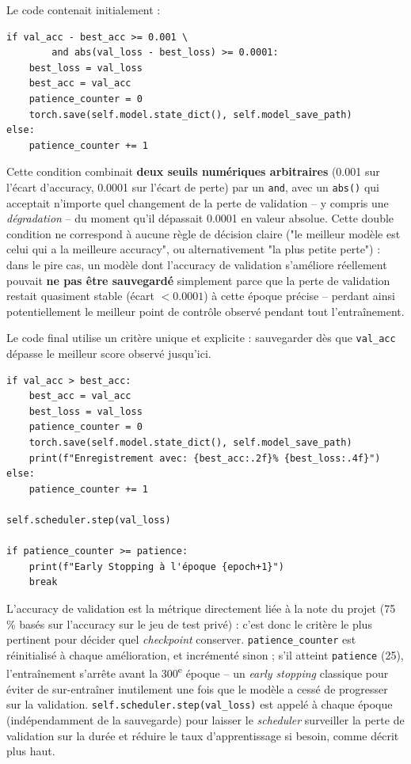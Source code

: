 \documentclass[a4paper,12pt]{article}
\begin{document}
Le code contenait initialement :
\begin{lstlisting}
if val_acc - best_acc >= 0.001 \
        and abs(val_loss - best_loss) >= 0.0001:
    best_loss = val_loss
    best_acc = val_acc
    patience_counter = 0
    torch.save(self.model.state_dict(), self.model_save_path)
else:
    patience_counter += 1
\end{lstlisting}

Cette condition combinait \textbf{deux seuils numériques arbitraires}
(0.001 sur l'écart d'accuracy, 0.0001 sur l'écart de perte) par un
\texttt{and}, avec un \texttt{abs()} qui acceptait n'importe quel
changement de la perte de validation -- y compris une
\emph{dégradation} -- du moment qu'il dépassait 0.0001 en valeur
absolue. Cette double condition ne correspond à aucune règle de décision
claire ("le meilleur modèle est celui qui a la meilleure accuracy", ou
alternativement "la plus petite perte") : dans le pire cas, un modèle
dont l'accuracy de validation s'améliore réellement pouvait \textbf{ne
pas être sauvegardé} simplement parce que la perte de validation restait
quasiment stable (écart $< 0.0001$) à cette époque précise -- perdant
ainsi potentiellement le meilleur point de contrôle observé pendant tout
l'entraînement.

Le code final utilise un critère unique et explicite : sauvegarder dès
que \texttt{val\_acc} dépasse le meilleur score observé jusqu'ici.

\begin{lstlisting}
if val_acc > best_acc:
    best_acc = val_acc
    best_loss = val_loss
    patience_counter = 0
    torch.save(self.model.state_dict(), self.model_save_path)
    print(f"Enregistrement avec: {best_acc:.2f}% {best_loss:.4f}")
else:
    patience_counter += 1

self.scheduler.step(val_loss)

if patience_counter >= patience:
    print(f"Early Stopping à l'époque {epoch+1}")
    break
\end{lstlisting}

L'accuracy de validation est la métrique directement liée à la note du
projet (75\,\% basés sur l'accuracy sur le jeu de test privé) : c'est
donc le critère le plus pertinent pour décider quel \emph{checkpoint}
conserver. \texttt{patience\_counter} est réinitialisé à chaque
amélioration, et incrémenté sinon ; s'il atteint \texttt{patience} (25),
l'entraînement s'arrête avant la 300\textsuperscript{e} époque -- un \emph{early
stopping} classique pour éviter de sur-entraîner inutilement une fois que
le modèle a cessé de progresser sur la validation.
\texttt{self.scheduler.step(val\_loss)} est appelé à chaque époque
(indépendamment de la sauvegarde) pour laisser le \emph{scheduler}
surveiller la perte de validation sur la durée et réduire le taux
d'apprentissage si besoin, comme décrit plus haut.
\end{document}
